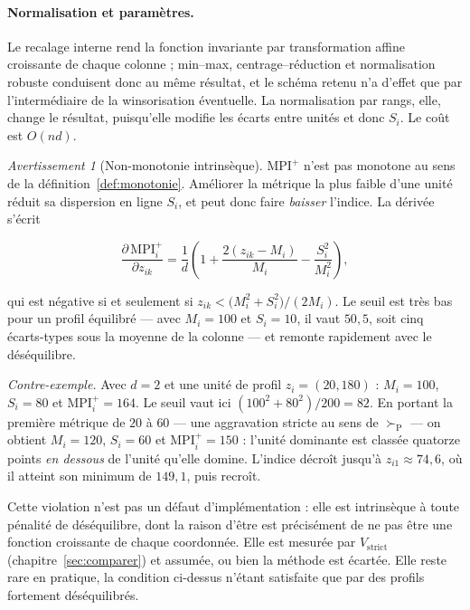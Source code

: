\documentclass[11pt,a4paper]{article}
\theoremstyle{definition}
\theoremstyle{remark}
\newtheorem{avertissement}{Avertissement}[section]
\newcommand{\pareto}{\succ_{\mathrm{P}}}
\begin{document}
\bigskip

\paragraph{Normalisation et paramètres.} Le recalage interne rend la fonction invariante
par transformation affine croissante de chaque colonne ; min--max, centrage--réduction et
normalisation robuste conduisent donc au même résultat, et le schéma retenu n'a d'effet
que par l'intermédiaire de la winsorisation éventuelle. La normalisation par rangs, elle,
change le résultat, puisqu'elle modifie les écarts entre unités et donc $S_i$. Le coût est
$O(nd)$.

\medskip

\begin{avertissement}[Non-monotonie intrinsèque]
  \label{av:mpi-monotonie}
  $\mathrm{MPI}^{+}$ n'est pas monotone au sens de la définition~\ref{def:monotonie}.
  Améliorer la métrique la plus faible d'une unité réduit sa dispersion en ligne $S_i$, et
  peut donc faire \emph{baisser} l'indice. La dérivée s'écrit

  \medskip

  \[
    \frac{\partial\,\mathrm{MPI}^{+}_i}{\partial z_{ik}}
    = \frac{1}{d}\left(1 + \frac{2(z_{ik} - M_i)}{M_i} - \frac{S_i^{2}}{M_i^{2}}\right),
  \]

  \bigskip

  qui est négative si et seulement si
  $z_{ik} < \big(M_i^{2} + S_i^{2}\big) / (2 M_i)$. Le seuil est très bas pour un profil
  équilibré --- avec $M_i = 100$ et $S_i = 10$, il vaut $50{,}5$, soit cinq écarts-types
  sous la moyenne de la colonne --- et remonte rapidement avec le déséquilibre.

  \medskip

  \emph{Contre-exemple.} Avec $d = 2$ et une unité de profil $z_i = (20, 180)$ :
  $M_i = 100$, $S_i = 80$ et $\mathrm{MPI}^{+}_i = 164$. Le seuil vaut ici
  $(100^2 + 80^2)/200 = 82$. En portant la première métrique de $20$ à $60$ --- une
  aggravation stricte au sens de $\pareto$ --- on obtient $M_i = 120$, $S_i = 60$ et
  $\mathrm{MPI}^{+}_i = 150$ : l'unité dominante est classée quatorze points \emph{en
  dessous} de l'unité qu'elle domine. L'indice décroît jusqu'à $z_{i1} \approx 74{,}6$,
  où il atteint son minimum de $149{,}1$, puis recroît.

  \medskip

  Cette violation n'est pas un défaut d'implémentation : elle est intrinsèque à toute
  pénalité de déséquilibre, dont la raison d'être est précisément de ne pas être une
  fonction croissante de chaque coordonnée. Elle est mesurée par $V_{\mathrm{strict}}$
  (chapitre~\ref{sec:comparer}) et assumée, ou bien la méthode est écartée. Elle reste
  rare en pratique, la condition ci-dessus n'étant satisfaite que par des profils
  fortement déséquilibrés.
\end{avertissement}
\end{document}

